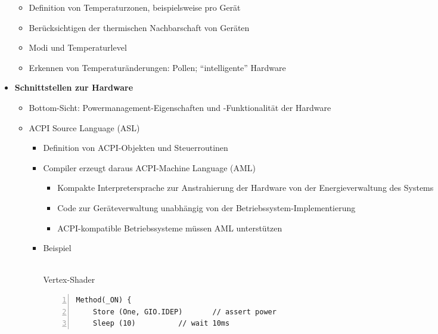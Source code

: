 \begin{itemize}
	\begin{itemize}
		\item Definition von Temperaturzonen, beispielsweise pro Gerät
		\item Berücksichtigen der thermischen Nachbarschaft von Geräten
		\item Modi und Temperaturlevel
		\item Erkennen von Temperaturänderungen: Pollen; "`intelligente"' Hardware
	\end{itemize}
	\item \textbf{Schnittstellen zur Hardware}
	\begin{itemize}
		\item Bottom-Sicht: Powermanagement-Eigenschaften und -Funktionalität der Hardware
		\item ACPI Source Language (ASL)
		\begin{itemize}
			\item Definition von ACPI-Objekten und Steuerroutinen
			\item Compiler erzeugt daraus ACPI-Machine Language (AML)
			\begin{itemize}
				\item Kompakte Interpretersprache zur Anstrahierung der Hardware von der Energieverwaltung des Systems
				\item Code zur Geräteverwaltung unabhängig von der Betriebssystem-Implementierung
				\item ACPI-kompatible Betriebssysteme müssen AML unterstützen
			\end{itemize}
			\item Beispiel\\\\
				\begin{minipage}{\textwidth}
				Vertex-Shader
				\begin{lstlisting}[frame=single,numbers=left,mathescape]
Method(_ON) {
	Store (One, GIO.IDEP)		// assert power
	Sleep (10)			// wait 10ms

\end{lstlisting}
\end{minipage}
\end{itemize}
\end{itemize}
\end{itemize}
